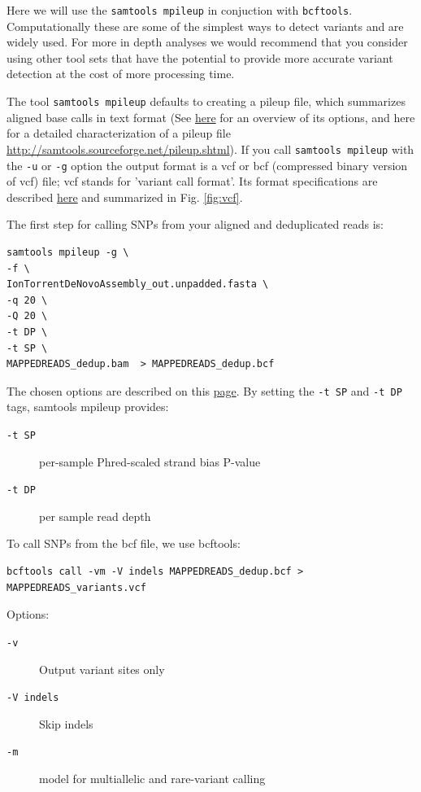 \documentclass[11pt]{article}
\begin{document}
Here we will use the \texttt{samtools mpileup} in conjuction with 
\texttt{bcftools}. Computationally these are some of the simplest ways to detect variants
and are widely used. For more in depth analyses we would recommend that you
consider using other tool sets that have the potential to provide more
accurate variant detection at the cost of more processing time.

The tool \texttt{samtools mpileup} defaults to creating a pileup file, which summarizes aligned
base calls in text format (See \href{http://samtools.sourceforge.net/samtools.shtml}{here} for an overview of its options, and here for a detailed characterization of
a pileup file \url{http://samtools.sourceforge.net/pileup.shtml}). If you
call \texttt{samtools mpileup} with the \texttt{-u} or \texttt{-g} option the
output format is a vcf or bcf (compressed binary version of vcf) file;
vcf stands for 'variant call format'. Its format specifications are
described \href{https://samtools.github.io/hts-specs/VCFv4.2.pdf}{here} and summarized in Fig. \ref{fig:vcf}.

The first step for calling SNPs from your aligned and deduplicated
reads is:

\begin{verbatim}
samtools mpileup -g \
-f \
IonTorrentDeNovoAssembly_out.unpadded.fasta \
-q 20 \
-Q 20 \
-t DP \
-t SP \
MAPPEDREADS_dedup.bam  > MAPPEDREADS_dedup.bcf
\end{verbatim}

The chosen options are described on this \href{http://samtools.sourceforge.net/samtools.shtml}{page}. By setting the \texttt{-t SP} and
\texttt{-t DP} tags, samtools mpileup provides:

\begin{description}
\item[{\texttt{-t SP}}] per-sample Phred-scaled strand bias P-value
\item[{\texttt{-t DP}}] per sample read depth
\end{description}


To call SNPs from the bcf file, we use bcftools:

\begin{verbatim}
bcftools call -vm -V indels MAPPEDREADS_dedup.bcf >  MAPPEDREADS_variants.vcf
\end{verbatim}


Options:
\begin{description}
\item[{\texttt{-v}}] Output variant sites only
\item[{\texttt{-V indels}}] Skip indels
\item[{\texttt{-m}}] model for multiallelic and rare-variant calling
\end{description}
\end{document}
